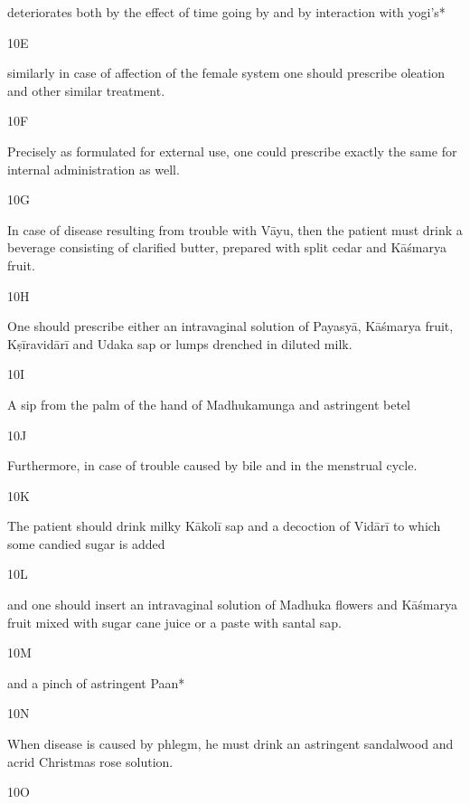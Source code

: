 \begin{translation}
\begin{tt}
deteriorates both by the effect of time going by and by interaction with 
  yogi’s*  
  
\item[10E]

similarly in case of affection of the female system one should prescribe 
  oleation and other  similar treatment.
  
\item[10F]

Precisely as formulated for external use, one could prescribe exactly 
  the same for internal administration as well.
  
\item[10G]

In case of disease resulting from trouble with Vāyu, then the patient 
  must drink a beverage consisting of clarified butter, prepared with split cedar 
  and Kāśmarya fruit.
  
\item[10H]

One should prescribe either an intravaginal solution of Payasyā, 
  Kāśmarya fruit, Kṣīravidārī and Udaka sap or lumps drenched in diluted milk.
  
\item[10I]

A sip from the palm of the hand of Madhukamunga and astringent betel
  
\item[10J]

Furthermore, in case of trouble caused by bile and in the menstrual 
  cycle.
  
\item[10K]

The patient should drink milky Kākolī sap and a decoction of Vidārī to 
  which some candied sugar is added
  
\item[10L]

and one should insert an intravaginal solution of Madhuka flowers and 
  Kāśmarya fruit mixed with sugar cane juice or a paste with santal sap.
  
\item[10M]

and a pinch of astringent Paan*
  
  
\item[10N]

When disease is caused by phlegm, he must drink an astringent 
  sandalwood and acrid Christmas rose solution.
  
\item[10O]


\end{tt}
\end{translation}
